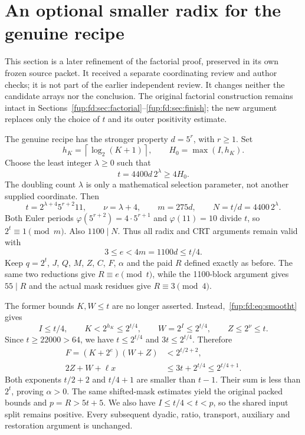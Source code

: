 \documentclass[11pt,letterpaper]{article}
\theoremstyle{definition}\newtheorem{definition}[theorem]{Definition}
\theoremstyle{remark}\newtheorem{remark}[theorem]{Remark}
\begin{document}
\section{An optional smaller radix for the genuine recipe}\label{fup:fd:sec:smooth}
This section is a later refinement of the factorial proof, preserved in its own frozen source packet. It received a separate coordinating review and author checks; it is not part of the earlier independent review. It changes neither the candidate arrays nor the conclusion. The original factorial construction remains intact in Sections~\ref{fup:fd:sec:factorial}--\ref{fup:fd:sec:finish}; the new argument replaces only the choice of $t$ and its outer positivity estimate.

The genuine recipe has the stronger property $d=5^r$, with $r\ge1$. Set
\[
 h_K=\left\lceil\log_2(K+1)\right\rceil,\qquad
 H_0=\max(I,h_K).
\]
Choose the least integer $\lambda\ge0$ such that
\begin{equation}\label{fup:fd:eq:smootht}
 t=4400d\,2^\lambda\ge4H_0.
\end{equation}
The doubling count $\lambda$ is only a mathematical selection parameter, not another supplied coordinate. Then
\[
 t=2^{\lambda+4}5^{r+2}11,\qquad
 \nu=\lambda+4,\qquad m=275d,\qquad
 N=t/d=4400\,2^\lambda.
\]
Both Euler periods $\varphi(5^{r+2})=4\cdot5^{r+1}$ and $\varphi(11)=10$ divide $t$, so $2^t\equiv1\pmod m$. Also $1100\mid N$. Thus all radix and CRT arguments remain valid with
\[
 3\le e<4m=1100d\le t/4.
\]
Keep $q=2^t$, $J$, $Q$, $M$, $Z$, $C$, $F$, $\alpha$ and the paid $R$ defined exactly as before. The same two reductions give $R\equiv e\pmod t$, while the 1100-block argument gives $55\mid R$ and the actual mask residues give $R\equiv3\pmod4$.

The former bounds $K,W\le t$ are no longer asserted. Instead,~\eqref{fup:fd:eq:smootht} gives
\[
 I\le t/4,\qquad K<2^{h_K}\le2^{t/4},\qquad
 W=2^I\le2^{t/4},\qquad Z\le2^\nu\le t.
\]
Since $t\ge22000>64$, we have $t\le2^{t/4}$ and $3t\le2^{t/4}$. Therefore
\begin{align*}
 F=(K+2^e)(W+Z)&<2^{t/2+2},\\
 2Z+W+\ell x&\le3t+2^{t/4}\le2^{t/4+1}.
\end{align*}
Both exponents $t/2+2$ and $t/4+1$ are smaller than $t-1$. Their sum is less than $2^t$, proving $\alpha>0$. The same shifted-mask estimates yield the original packed bounds and $p=R>5t+5$. We also have $I\le t/4<t<p$, so the shared input split remains positive. Every subsequent dyadic, ratio, transport, auxiliary and restoration argument is unchanged.
\end{document}
